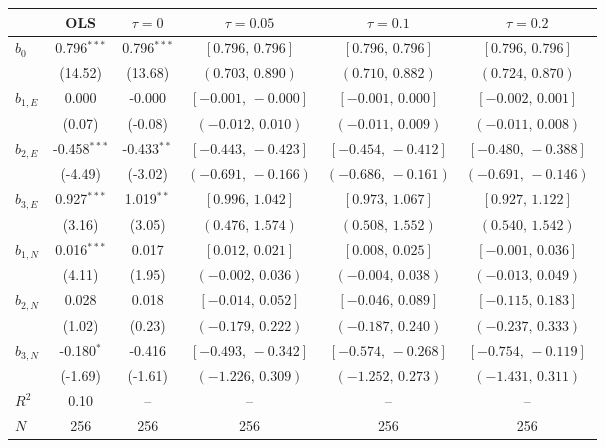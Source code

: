 \documentclass[11pt]{article}
\begin{document}
\begingroup
\footnotesize\setlength{\tabcolsep}{3pt}
\begin{tabular}{lccccc}
\toprule
 & OLS & $\tau{=}0$ & $\tau{=}0.05$ & $\tau{=}0.1$ & $\tau{=}0.2$ \\
\midrule
$b_0$ & 0.796$^{***}$ & 0.796$^{***}$ & $[0.796,\,0.796]$ & $[0.796,\,0.796]$ & $[0.796,\,0.796]$ \\
 & (14.52) & (13.68) & $(0.703,\,0.890)$ & $(0.710,\,0.882)$ & $(0.724,\,0.870)$ \\
$b_{1,E}$ & 0.000 & -0.000 & $[-0.001,\,-0.000]$ & $[-0.001,\,0.000]$ & $[-0.002,\,0.001]$ \\
 & (0.07) & (-0.08) & $(-0.012,\,0.010)$ & $(-0.011,\,0.009)$ & $(-0.011,\,0.008)$ \\
$b_{2,E}$ & -0.458$^{***}$ & -0.433$^{**}$ & $[-0.443,\,-0.423]$ & $[-0.454,\,-0.412]$ & $[-0.480,\,-0.388]$ \\
 & (-4.49) & (-3.02) & $(-0.691,\,-0.166)$ & $(-0.686,\,-0.161)$ & $(-0.691,\,-0.146)$ \\
$b_{3,E}$ & 0.927$^{***}$ & 1.019$^{**}$ & $[0.996,\,1.042]$ & $[0.973,\,1.067]$ & $[0.927,\,1.122]$ \\
 & (3.16) & (3.05) & $(0.476,\,1.574)$ & $(0.508,\,1.552)$ & $(0.540,\,1.542)$ \\
\midrule
$b_{1,N}$ & 0.016$^{***}$ & 0.017 & $[0.012,\,0.021]$ & $[0.008,\,0.025]$ & $[-0.001,\,0.036]$ \\
 & (4.11) & (1.95) & $(-0.002,\,0.036)$ & $(-0.004,\,0.038)$ & $(-0.013,\,0.049)$ \\
$b_{2,N}$ & 0.028 & 0.018 & $[-0.014,\,0.052]$ & $[-0.046,\,0.089]$ & $[-0.115,\,0.183]$ \\
 & (1.02) & (0.23) & $(-0.179,\,0.222)$ & $(-0.187,\,0.240)$ & $(-0.237,\,0.333)$ \\
$b_{3,N}$ & -0.180$^{*}$ & -0.416 & $[-0.493,\,-0.342]$ & $[-0.574,\,-0.268]$ & $[-0.754,\,-0.119]$ \\
 & (-1.69) & (-1.61) & $(-1.226,\,0.309)$ & $(-1.252,\,0.273)$ & $(-1.431,\,0.311)$ \\
\midrule
$R^2$ & 0.10 & -- & -- & -- & -- \\
$N$ & 256 & 256 & 256 & 256 & 256 \\
\bottomrule
\end{tabular}
\endgroup
\end{document}

